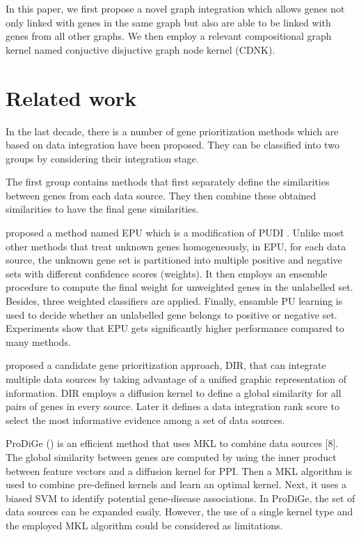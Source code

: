 In this paper, we first propose a novel graph integration which allows genes not only linked with genes in the same graph but also are able to be linked with genes from all other graphs. We then employ a relevant compositional graph kernel named conjuctive disjuctive graph node kernel (CDNK).

\section{Related work}
In the last decade, there is a number of gene prioritization methods which are based on data integration have been proposed. They can be classified into two groups by considering their integration stage.

The first group contains methods that first separately define the similarities between genes from each data source. They then combine these obtained similarities to have the final gene similarities.

\cite{epu} proposed a method named EPU which is a modification of PUDI \cite{pudi}. Unlike most other methods that treat unknown genes homogeneously, in EPU, for each data source, the unknown gene set is partitioned into multiple positive and negative sets with different confidence scores (weights). It then employs an ensemble procedure to compute the final weight for unweighted genes in the unlabelled set. Besides, three weighted classifiers are applied. Finally, ensamble PU learning is used to decide whether an unlabelled gene belongs to positive or negative set. Experiments show that EPU gets significantly higher performance compared to many methods.

\cite{dir} proposed a candidate gene prioritization approach, DIR, that can integrate multiple data sources by taking advantage of a unified graphic representation of information. DIR employs a diffusion kernel to define a global similarity for all pairs of genes in every source. Later it defines a data integration rank score to select the most informative evidence among a set of data sources.

ProDiGe (\cite{prodige}) is an efficient method that uses MKL to combine data sources [8]. The global similarity between genes are computed by using the inner product between feature vectors and a diffusion kernel for PPI. Then a MKL algorithm is used to combine pre-defined kernels and learn an optimal kernel. Next, it uses a biased SVM to identify potential gene-disease associations. In ProDiGe, the set of data sources can be expanded easily. However, the use of a single kernel type and the employed MKL algorithm could be considered as limitations.

